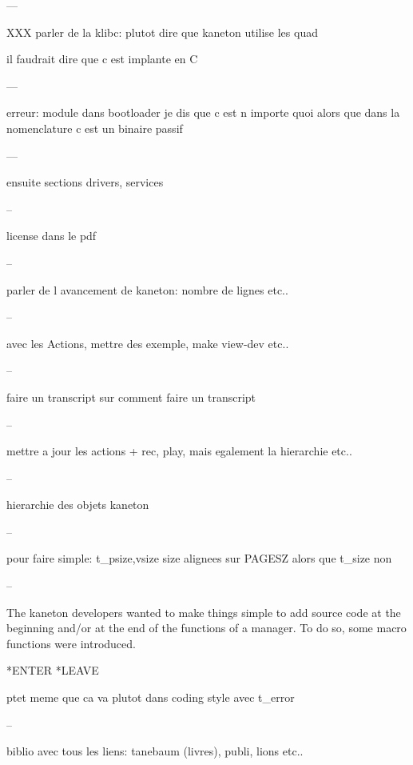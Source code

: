 ---

XXX parler de la klibc: plutot dire que kaneton utilise les quad

il faudrait dire que c est implante en C

---

erreur: module dans bootloader je dis que c est n importe quoi alors
 que dans la nomenclature c est un binaire passif

---

ensuite sections drivers, services

--

license dans le pdf

--

parler de l avancement de kaneton: nombre de lignes etc..

--

avec les Actions, mettre des exemple, make view-dev etc..

--

faire un transcript sur comment faire un transcript

--

mettre a jour les actions + rec, play, mais egalement la hierarchie etc..

--

hierarchie des objets kaneton

--

pour faire simple: t_{psize,vsize} size alignees sur PAGESZ alors
 que t_size non

--

The kaneton developers wanted to make things simple to add source code
at the beginning and/or at the end of the functions of a manager. To do
so, some macro functions were introduced.

*ENTER *LEAVE

ptet meme que ca va plutot dans coding style avec t_error

--

biblio avec tous les liens: tanebaum (livres), publi, lions etc..

